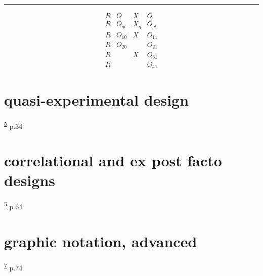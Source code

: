 \documentclass[
]{book}
\theoremstyle{definition}
\theoremstyle{definition}
\theoremstyle{definition}
\theoremstyle{definition}
\theoremstyle{remark}
\begin{document}
\begin{center}\rule{0.5\linewidth}{0.5pt}\end{center}

\[
\begin{array}{cccc}
R & O & X & O\\
R & O_{gt} & X_{g} & O_{gt}\\
R & O_{10} & X & O_{11}\\
R & O_{20} &  & O_{21}\\
R &  & X & O_{31}\\
R &  &  & O_{41}
\end{array}
\]

\hypertarget{quasi-experimental-design}{%
\section{quasi-experimental design}\label{quasi-experimental-design}}

\textsuperscript{\protect\hyperlink{ref-campbell1963}{5}} p.34

\hypertarget{correlational-and-ex-post-facto-designs}{%
\section{correlational and ex post facto designs}\label{correlational-and-ex-post-facto-designs}}

\textsuperscript{\protect\hyperlink{ref-campbell1963}{5}} p.64

\hypertarget{graphic-notation-advanced}{%
\section{graphic notation, advanced}\label{graphic-notation-advanced}}

\textsuperscript{\protect\hyperlink{ref-hu2022}{7}} p.74
\end{document}
